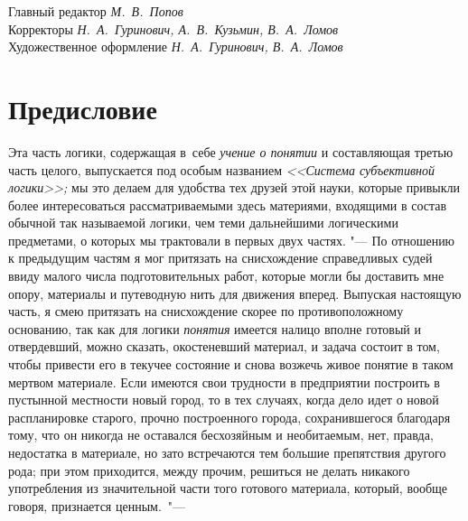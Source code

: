 Главный редактор {\em М.~В.~Попов} \\
Корректоры {\em Н.~А.~Гуринович, А.~В.~Кузьмин, В.~А.~Ломов} \\
Художественное оформление {\em Н.~А.~Гуринович, В.~А.~Ломов}

\bigskip
\clearpage

\chapter[Предисловие]{Предисловие}

Эта часть логики, содержащая в~себе {\em учение о понятии} и составляющая
третью часть целого, выпускается под особым названием {\em <<Система
субъективной логики>>;} мы это делаем для удобства тех друзей этой науки,
которые привыкли более интересоваться рассматриваемыми здесь материями,
входящими в состав обычной так называемой логики, чем теми дальнейшими
логическими предметами, о которых мы трактовали в первых двух частях. "---
По отношению к предыдущим частям я мог притязать на снисхождение
справедливых судей ввиду малого числа подготовительных работ, которые могли
бы доставить мне опору, материалы и путеводную нить для
движения вперед. Выпуская настоящую часть, я смею притязать на снисхождение
скорее по противоположному основанию, так как для логики {\em понятия} имеется
налицо вполне готовый и отвердевший, можно сказать, окостеневший материал,
и задача состоит в том, чтобы привести его в текучее состояние и снова
возжечь живое понятие в таком мертвом материале. Если имеются свои
трудности в предприятии построить в пустынной местности новый город, то в
тех случаях, когда дело идет о новой распланировке старого, прочно
построенного города, сохранившегося благодаря тому, что он никогда не
оставался бесхозяйным и необитаемым, нет, правда, недостатка в материале,
но зато встречаются тем большие препятствия другого рода; при этом
приходится, между прочим, решиться не делать никакого употребления из
значительной части того готового материала, который, вообще говоря,
признается ценным.~"---

